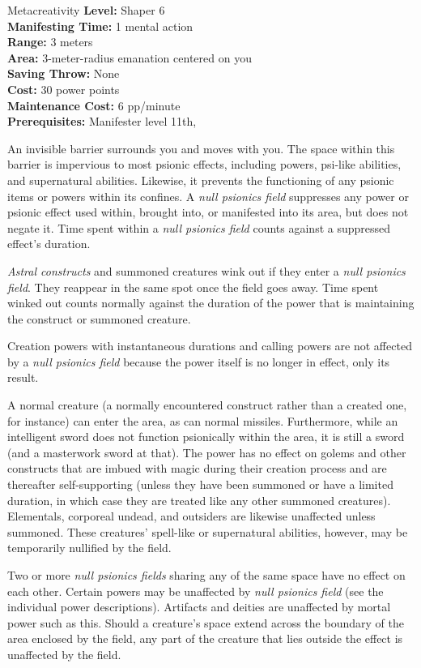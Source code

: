 {Metacreativity}
{
	\textbf{Level:}
	Shaper 6\\
	\textbf{Manifesting Time:}
	1 mental action\\
	\textbf{Range:}
	3 meters\\
	\textbf{Area:}
	3-meter-radius emanation centered on you\\
	\textbf{Saving Throw:}
	None\\
	\textbf{Cost:}
	30 power points\\
	\textbf{Maintenance Cost:}
	6 pp/minute\\
	\textbf{Prerequisites:}
	Manifester level 11th, \\
}
{
	An invisible barrier surrounds you and moves with you. The space within this barrier is impervious to most psionic effects, including powers, psi-like abilities, and supernatural abilities. Likewise, it prevents the functioning of any psionic items or powers within its confines. A \emph{null psionics field} suppresses any power or psionic effect used within, brought into, or manifested into its area, but does not negate it. Time spent within a \emph{null psionics field} counts against a suppressed effect's duration.

	\emph{Astral constructs} and summoned creatures wink out if they enter a \emph{null psionics field}. They reappear in the same spot once the field goes away. Time spent winked out counts normally against the duration of the power that is maintaining the construct or summoned creature.

	Creation powers with instantaneous durations and calling powers are not affected by a \emph{null psionics field} because the power itself is no longer in effect, only its result.

	A normal creature (a normally encountered construct rather than a created one, for instance) can enter the area, as can normal missiles. Furthermore, while an intelligent sword does not function psionically within the area, it is still a sword (and a masterwork sword at that). The power has no effect on golems and other constructs that are imbued with magic during their creation process and are thereafter self-supporting (unless they have been summoned or have a limited duration, in which case they are treated like any other summoned creatures). Elementals, corporeal undead, and outsiders are likewise unaffected unless summoned. These creatures' spell-like or supernatural abilities, however, may be temporarily nullified by the field.

	Two or more \emph{null psionics fields} sharing any of the same space have no effect on each other. Certain powers may be unaffected by \emph{null psionics field} (see the individual power descriptions). Artifacts and deities are unaffected by mortal power such as this. Should a creature's space extend across the boundary of the area enclosed by the field, any part of the creature that lies outside the effect is unaffected by the field.
}